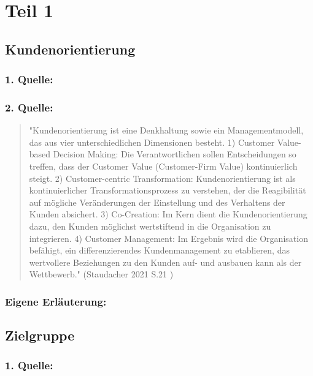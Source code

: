 \section{Teil 1}
    \subsection{Kundenorientierung}
       \subsubsection*{1. Quelle:}
        \begin{abstract}
        \end{abstract}
        \subsubsection*{2. Quelle:}
        \begin{abstract}
        \noindent"Kundenorientierung ist eine Denkhaltung sowie ein Managementmodell, das
aus vier unterschiedlichen Dimensionen besteht. 1) Customer Value-based Decision
Making: Die Verantwortlichen sollen Entscheidungen so treffen, dass der Customer
Value (Customer-Firm Value) kontinuierlich steigt. 2) Customer-centric Transformation:
Kundenorientierung ist als kontinuierlicher Transformationsprozess zu verstehen, der die
Reagibilität auf mögliche Veränderungen der Einstellung und des Verhaltens der Kunden
absichert. 3) Co-Creation: Im Kern dient die Kundenorientierung dazu, den Kunden
möglichst wertstiftend in die Organisation zu integrieren. 4) Customer Management: Im
Ergebnis wird die Organisation befähigt, ein differenzierendes Kundenmanagement zu
etablieren, das wertvollere Beziehungen zu den Kunden auf- und ausbauen kann als der
Wettbewerb." (Staudacher 2021 S.21 )
        \end{abstract}
        \subsubsection*{Eigene Erläuterung:}
        \begin{abstract}
        \end{abstract}
    \subsection{Zielgruppe}
        \subsubsection*{1. Quelle:}
        \begin{abstract}
        \end{abstract}
